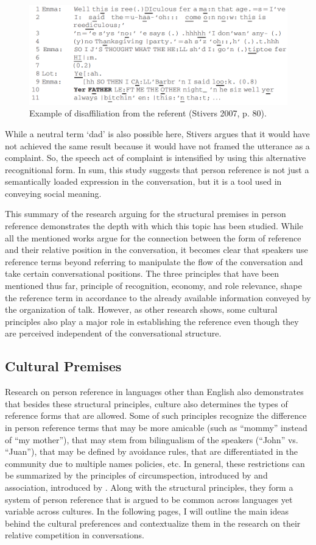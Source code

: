 \documentclass[12pt]{article}
\begin{document}
\begin{figure}[h]
\caption{Example of disaffiliation from the referent (Stivers 2007, p. 80).}
\label{stivers}
\includegraphics[width=5in]{stivers.png}
\end{figure}
While a neutral term `dad' is also possible here, Stivers argues that it would have not achieved the same result because it would have not framed the utterance as a complaint. So, the speech act of complaint is intensified by using this alternative recognitional form. In sum, this study suggests that person reference is not just a semantically loaded expression in the conversation, but it is a tool used in conveying social meaning. 

This summary of the research arguing for the structural premises in person reference demonstrates the depth with which this topic has been studied. While all the mentioned works argue for the connection between the form of reference and their relative position in the conversation, it becomes clear that speakers use reference terms beyond referring to manipulate the flow of the conversation and take certain conversational positions. The three principles that have been mentioned thus far, principle of recognition, economy, and role relevance, shape the reference term in accordance to the already available information conveyed by the organization of talk. However, as other research shows, some cultural principles also play a major role in establishing the reference even though they are perceived independent of the conversational structure. 
  
\subsection{Cultural Premises}
Research on person reference in languages other than English also demonstrates that besides these structural principles, culture also determines the types of reference forms that are allowed. Some of such principles recognize the difference in person reference terms that may be more amicable (such as ``mommy'' instead of ``my mother''), that may stem from bilingualism of the speakers (``John'' vs. ``Juan''), that may be defined by avoidance rules, that are differentiated in the community due to multiple names policies, etc. In general, these restrictions can be summarized by the principles of circumspection, introduced by \textcite{levinson2007} and association, introduced by \textcite{brown2007}. Along with the structural principles, they form a system of person reference that is argued to be common across languages yet variable across cultures. In the following pages, I will outline the main ideas behind the cultural preferences and contextualize them in the research on their relative competition in conversations.  
\end{document}
